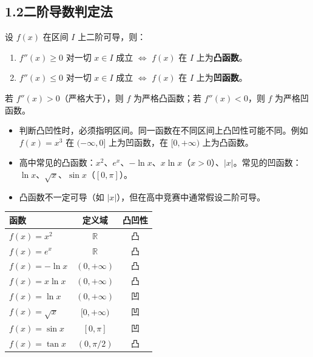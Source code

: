 \documentclass[12pt, a4paper]{ctexart}
\begin{document}
\subsection*{1.2\quad 二阶导数判定法}

\begin{knowledgebox}[二阶导数判定定理]
设 $f(x)$ 在区间 $I$ 上二阶可导，则：
\begin{enumerate}[label=(\arabic*)]
  \item $f''(x) \geq 0$ 对一切 $x \in I$ 成立 $\Longleftrightarrow$ $f(x)$ 在 $I$ 上为\textbf{凸函数}。
  \item $f''(x) \leq 0$ 对一切 $x \in I$ 成立 $\Longleftrightarrow$ $f(x)$ 在 $I$ 上为\textbf{凹函数}。
\end{enumerate}
若 $f''(x) > 0$（严格大于），则 $f$ 为严格凸函数；若 $f''(x) < 0$，则 $f$ 为严格凹函数。
\end{knowledgebox}

\begin{warnbox}[易错提醒]
\begin{itemize}
  \item 判断凸凹性时，必须指明区间。同一函数在不同区间上凸凹性可能不同。例如 $f(x) = x^3$ 在 $(-\infty, 0]$ 上为凹函数，在 $[0, +\infty)$ 上为凸函数。
  \item 高中常见的凸函数：$x^2$、$e^x$、$-\ln x$、$x\ln x$（$x > 0$）、$|x|$。常见的凹函数：$\ln x$、$\sqrt{x}$、$\sin x$（$[0,\pi]$）。
  \item 凸函数不一定可导（如 $|x|$），但在高中竞赛中通常假设二阶可导。
\end{itemize}
\end{warnbox}

\begin{tipbox}[常见函数的凸凹性]
\begin{center}
\begin{tabular}{lcc}
\toprule
函数 & 定义域 & 凸凹性 \\
\midrule
$f(x) = x^2$ & $\mathbb{R}$ & 凸 \\
$f(x) = e^x$ & $\mathbb{R}$ & 凸 \\
$f(x) = -\ln x$ & $(0, +\infty)$ & 凸 \\
$f(x) = x \ln x$ & $(0, +\infty)$ & 凸 \\
$f(x) = \ln x$ & $(0, +\infty)$ & 凹 \\
$f(x) = \sqrt{x}$ & $[0, +\infty)$ & 凹 \\
$f(x) = \sin x$ & $[0, \pi]$ & 凹 \\
$f(x) = \tan x$ & $(0, \pi/2)$ & 凸 \\
\bottomrule
\end{tabular}
\end{center}
\end{tipbox}
\end{document}
